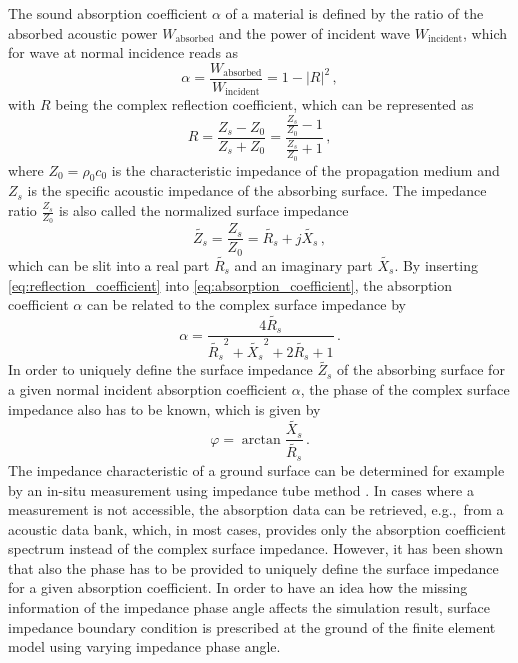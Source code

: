 {The sound absorption coefficient $\alpha$ of a material is defined by the ratio of the absorbed acoustic power $W_{\text{absorbed}}$ and the power of incident wave $W_{\text{incident}}$, which for wave at normal incidence reads as
\begin{equation}
	\alpha = \frac{W_{\text{absorbed}}}{W_\text{incident}} = 1 - |R|^2\,, \label{eq:absorption_coefficient}
\end{equation}
with $R$ being the complex reflection coefficient, which can be represented as
\begin{equation}
	R = \frac{Z_s - Z_0}{Z_s + Z_0} = \frac{\frac{Z_s}{Z_0} - 1}{\frac{Z_s}{Z_0} + 1}\,, \label{eq:reflection_coefficient}
\end{equation}
where $Z_0 = \rho_0 c_0$ is the characteristic impedance of the propagation medium and $Z_s$ is the specific acoustic impedance of the absorbing surface.
The impedance ratio $\frac{Z_s}{Z_0}$ is also called the normalized surface impedance
\begin{equation}
	\tilde{Z_s} = \frac{Z_s}{Z_0} = \tilde{R_s} + j\tilde{X_s}\,,
\end{equation}
which can be slit into a real part $\tilde{R_s}$ and an imaginary part $\tilde{X_s}$. By inserting \cref{eq:reflection_coefficient} into \cref{eq:absorption_coefficient}, the absorption coefficient $\alpha$ can be related to the complex surface impedance by
\begin{equation}
	\alpha = \frac{4\tilde{R_s}}{\tilde{R_s}^2+\tilde{X_s}^2 + 2\tilde{R_s} + 1} \,. \label{eq:absorption_coefficient_2}
\end{equation}
In order to uniquely define the surface impedance $\tilde{Z_s}$ of the absorbing surface for a given normal incident absorption coefficient $\alpha$, the phase of the complex surface impedance also has to be known, which is given by
\begin{equation}
	 \varphi = \arctan{\frac{\tilde{X_s}}{\tilde{R_s}}}\,. \label{eq:impedance_phase_angle}
\end{equation}
The impedance characteristic of a ground surface can be determined for example by an in-situ measurement using impedance tube method \cite{wolkesson_2013,Seybert2008MeasurementOP}.
In cases where a measurement is not accessible, the absorption data can be retrieved, e.g.,\ from a acoustic data bank, which, in most cases, provides only the absorption coefficient spectrum instead of the complex surface impedance.
However, it has been shown that also the phase has to be provided to uniquely define the surface impedance for a given absorption coefficient.
In order to have an idea how the missing information of the impedance phase angle affects the simulation result, surface impedance boundary condition is prescribed at the ground of the finite element model using varying impedance phase angle.

}
